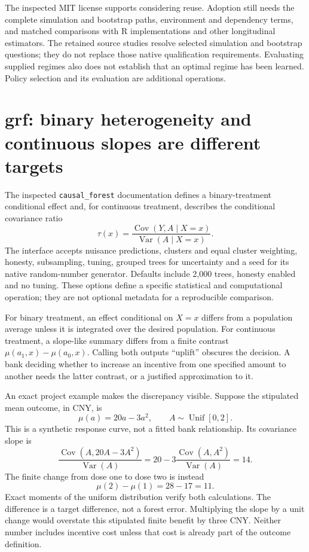 The inspected MIT license supports considering reuse. Adoption still needs the
complete simulation and bootstrap paths, environment and dependency terms, and
matched comparisons with R implementations and other longitudinal estimators.
The retained source studies resolve selected simulation and bootstrap questions;
they do not replace those native qualification requirements.
Evaluating supplied regimes also does not establish that an optimal regime has
been learned. Policy selection and its evaluation are additional operations.

\section{grf: binary heterogeneity and continuous slopes are different targets}

The inspected \texttt{causal\_forest} documentation defines a binary-treatment
conditional effect and, for continuous treatment, describes the conditional
covariance ratio
\[
 \tau(x)=\frac{\operatorname{Cov}(Y,A\mid X=x)}
                    {\operatorname{Var}(A\mid X=x)}.
\]
The interface accepts nuisance predictions, clusters and equal cluster
weighting, honesty, subsampling, tuning, grouped trees for uncertainty and a
seed for its native random-number generator. Defaults include 2,000 trees,
honesty enabled and no tuning. These options define a specific statistical and
computational operation; they are not optional metadata for a reproducible
comparison. \citep{v13_sw_grf}

For binary treatment, an effect conditional on $X=x$ differs from a population
average unless it is integrated over the desired population. For continuous
treatment, a slope-like summary differs from a finite contrast
$\mu(a_1,x)-\mu(a_0,x)$. Calling both outputs ``uplift'' obscures the decision.
A bank deciding whether to increase an incentive from one specified amount to
another needs the latter contrast, or a justified approximation to it.

An exact project example makes the discrepancy visible. Suppose the stipulated
mean outcome, in CNY, is
\[
 \mu(a)=20a-3a^2,\qquad A\sim\operatorname{Unif}[0,2].
\]
This is a synthetic response curve, not a fitted bank relationship. Its
covariance slope is
\[
 \frac{\operatorname{Cov}(A,20A-3A^2)}{\operatorname{Var}(A)}
 =20-3\frac{\operatorname{Cov}(A,A^2)}{\operatorname{Var}(A)}=14.
\]
The finite change from dose one to dose two is instead
\[
 \mu(2)-\mu(1)=28-17=11.
\]
Exact moments of the uniform distribution verify both calculations. The
difference is a target difference, not a forest error. Multiplying the slope
by a unit change would overstate this stipulated finite benefit by three CNY.
Neither number includes incentive cost unless that cost is already part of the
outcome definition. \citep{v13_project_exact}

